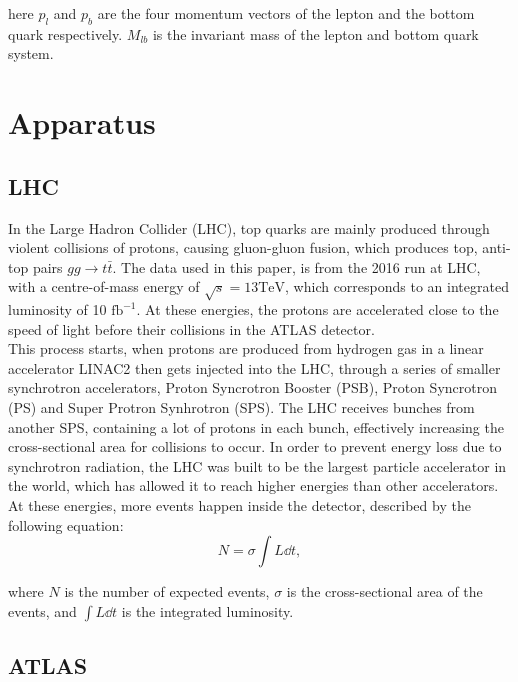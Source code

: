 \documentclass[11pt,a4paper]{article}
\begin{document}
here $p_l$ and $p_b$ are the four momentum vectors of the lepton and the bottom
quark respectively. $M_{lb}$ is the invariant mass of the lepton and bottom
quark system.

\section{Apparatus}

\subsection{LHC}
In the Large Hadron Collider (LHC), top quarks are mainly produced through
violent collisions of protons, causing gluon-gluon fusion, which produces top,
anti-top pairs $gg \rightarrow t\bar t$. The data used in this paper, is from the 2016 run
at LHC, with a centre-of-mass energy of $\sqrt s = 13 \mathrm{TeV}$, which
corresponds to an integrated luminosity of 10 $\mathrm{fb}^{-1}$. At these
energies, the protons are accelerated close to the speed of light before their
collisions in the ATLAS detector.\\

This process starts, when protons are produced from hydrogen gas in a linear
accelerator LINAC2 then gets injected into the LHC, through a series of smaller
synchrotron accelerators, Proton Syncrotron Booster (PSB), Proton Syncrotron
(PS) and Super Protron Synhrotron (SPS). The LHC receives bunches from another
SPS, containing a lot of protons in each bunch, effectively increasing the
cross-sectional area for collisions to occur. In order to prevent energy loss
due to synchrotron radiation, the LHC was built to be the largest particle
accelerator in the world, which has allowed it to reach higher energies than
other accelerators. At these energies, more events happen inside the detector,
described by the following equation:
\begin{equation}
  N = \sigma \int L \dd t,
\end{equation}

where $N$ is the number of expected events, $\sigma$ is the cross-sectional area of
the events, and $\int L \dd t$ is the integrated luminosity.

\subsection{ATLAS}
\end{document}
